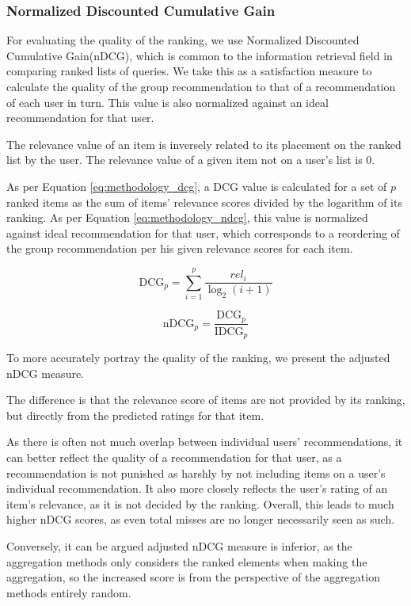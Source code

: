 \subsubsection{Normalized Discounted Cumulative Gain}
For evaluating the quality of the ranking, we use Normalized Discounted Cumulative Gain(nDCG), which is common to the information retrieval field in comparing ranked lists of queries. We take this as a satisfaction measure to calculate the quality of the group recommendation to that of a recommendation of each user in turn. This value is also normalized against an ideal recommendation for that user.


The relevance value of an item is inversely related to its placement on the ranked list by the user. The relevance value of a given item not on a user's list is 0.

As per Equation \ref{eq:methodology_dcg}, a DCG value is calculated for a set of $p$ ranked items as the sum of items' relevance scores divided by the logarithm of its ranking. As per Equation \ref{eq:methodology_ndcg}, this value is normalized against ideal recommendation for that user, which corresponds to a reordering of the group recommendation per his given relevance scores for each item.

\begin{equation}\label{eq:methodology_dcg}
\text{DCG}_p = \sum_{i=1}^{p}\frac{\textit{rel}_i}{\log_2(i + 1)}
\end{equation}

\begin{equation}\label{eq:methodology_ndcg}
\text{nDCG}_p = \frac{\text{DCG}_p}{\text{IDCG}_p}
\end{equation}

To more accurately portray the quality of the ranking, we present the adjusted nDCG measure.

The difference is that the relevance score of items are not provided by its ranking, but directly from the predicted ratings for that item.

As there is often not much overlap between individual users' recommendations, it can better reflect the quality of a recommendation for that user, as a recommendation is not punished as harshly by not including items on a user's individual recommendation. It also more closely reflects the user's rating of an item's relevance, as it is not decided by the ranking. Overall, this leads to much higher nDCG scores, as even total misses are no longer necessarily seen as such.

Conversely, it can be argued adjusted nDCG measure is inferior, as the aggregation methods only considers the ranked elements when making the aggregation, so the increased score is from the perspective of the aggregation methods entirely random.